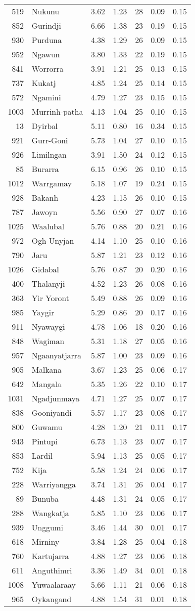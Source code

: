 \begin{longtable}[]{@{}rlrrrrr@{}}
519 & Nukunu & 3.62 & 1.23 & 28 & 0.09 & 0.15\tabularnewline
852 & Gurindji & 6.66 & 1.38 & 23 & 0.19 & 0.15\tabularnewline
930 & Purduna & 4.38 & 1.29 & 26 & 0.09 & 0.15\tabularnewline
952 & Ngawun & 3.80 & 1.33 & 22 & 0.19 & 0.15\tabularnewline
841 & Worrorra & 3.91 & 1.21 & 25 & 0.13 & 0.15\tabularnewline
737 & Kukatj & 4.85 & 1.24 & 25 & 0.14 & 0.15\tabularnewline
572 & Ngamini & 4.79 & 1.27 & 23 & 0.15 & 0.15\tabularnewline
1003 & Murrinh-patha & 4.13 & 1.04 & 25 & 0.10 & 0.15\tabularnewline
13 & Dyirbal & 5.11 & 0.80 & 16 & 0.34 & 0.15\tabularnewline
921 & Gurr-Goni & 5.73 & 1.04 & 27 & 0.10 & 0.15\tabularnewline
926 & Limilngan & 3.91 & 1.50 & 24 & 0.12 & 0.15\tabularnewline
85 & Burarra & 6.15 & 0.96 & 26 & 0.10 & 0.15\tabularnewline
1012 & Warrgamay & 5.18 & 1.07 & 19 & 0.24 & 0.15\tabularnewline
928 & Bakanh & 4.23 & 1.15 & 26 & 0.10 & 0.15\tabularnewline
787 & Jawoyn & 5.56 & 0.90 & 27 & 0.07 & 0.16\tabularnewline
1025 & Waalubal & 5.76 & 0.88 & 20 & 0.21 & 0.16\tabularnewline
972 & Ogh Unyjan & 4.14 & 1.10 & 25 & 0.10 & 0.16\tabularnewline
790 & Jaru & 5.87 & 1.21 & 23 & 0.12 & 0.16\tabularnewline
1026 & Gidabal & 5.76 & 0.87 & 20 & 0.20 & 0.16\tabularnewline
400 & Thalanyji & 4.52 & 1.23 & 26 & 0.08 & 0.16\tabularnewline
363 & Yir Yoront & 5.49 & 0.88 & 26 & 0.09 & 0.16\tabularnewline
985 & Yaygir & 5.29 & 0.86 & 20 & 0.17 & 0.16\tabularnewline
911 & Nyawaygi & 4.78 & 1.06 & 18 & 0.20 & 0.16\tabularnewline
848 & Wagiman & 5.31 & 1.18 & 27 & 0.05 & 0.16\tabularnewline
957 & Ngaanyatjarra & 5.87 & 1.00 & 23 & 0.09 & 0.16\tabularnewline
905 & Malkana & 3.67 & 1.23 & 25 & 0.06 & 0.17\tabularnewline
642 & Mangala & 5.35 & 1.26 & 22 & 0.10 & 0.17\tabularnewline
1031 & Ngadjunmaya & 4.71 & 1.27 & 25 & 0.07 & 0.17\tabularnewline
838 & Gooniyandi & 5.57 & 1.17 & 23 & 0.08 & 0.17\tabularnewline
800 & Guwamu & 4.28 & 1.20 & 21 & 0.11 & 0.17\tabularnewline
943 & Pintupi & 6.73 & 1.13 & 23 & 0.07 & 0.17\tabularnewline
853 & Lardil & 5.94 & 1.13 & 25 & 0.05 & 0.17\tabularnewline
752 & Kija & 5.58 & 1.24 & 24 & 0.06 & 0.17\tabularnewline
228 & Warriyangga & 3.74 & 1.31 & 26 & 0.04 & 0.17\tabularnewline
89 & Bunuba & 4.48 & 1.31 & 24 & 0.05 & 0.17\tabularnewline
288 & Wangkatja & 5.85 & 1.10 & 23 & 0.06 & 0.17\tabularnewline
939 & Unggumi & 3.46 & 1.44 & 30 & 0.01 & 0.17\tabularnewline
618 & Mirniny & 3.84 & 1.28 & 25 & 0.04 & 0.18\tabularnewline
760 & Kartujarra & 4.88 & 1.27 & 23 & 0.06 & 0.18\tabularnewline
611 & Anguthimri & 3.36 & 1.49 & 34 & 0.01 & 0.18\tabularnewline
1008 & Yuwaalaraay & 5.66 & 1.11 & 21 & 0.06 & 0.18\tabularnewline
965 & Oykangand & 4.88 & 1.54 & 31 & 0.01 & 0.18\tabularnewline

\end{longtable}
